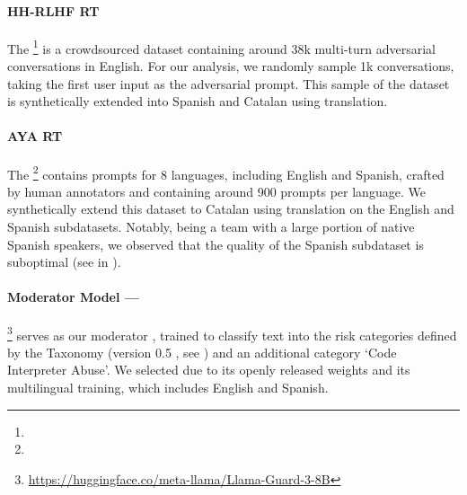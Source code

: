 
\paragraph{HH-RLHF RT} The \HHRedTeamingDataset{}\footnote{\hfLinkHHRLHFDataset{}} \cite{ganguli_hh_rlhf} is a crowdsourced dataset containing around 38k multi-turn adversarial conversations in English. For our analysis, we randomly sample 1k conversations, taking the first user input as the adversarial prompt. This sample of the dataset is synthetically extended into Spanish and Catalan using \NLLB{} translation.

\paragraph{AYA RT} The \AyaDataset{}\footnote{\hfLinkAyaRTDataset{}} \cite{aakanksha_aya_rt_dataset} contains \RedTeaming{} prompts for 8 languages, including English and Spanish, crafted by human annotators and containing around 900 prompts per language. We synthetically extend this dataset to Catalan using \NLLB{} translation on the English and Spanish subdatasets. 
Notably, being a team with a large portion of native Spanish speakers, we observed that the quality of the Spanish subdataset is suboptimal (see  in ).

\newcommand{\hfLinkLlamaGuard}{\url{https://huggingface.co/meta-llama/Llama-Guard-3-8B}}

\paragraph{Moderator Model — \LlamaGuard{}}
\LlamaGuard{}\footnote{\hfLinkLlamaGuard{}} \cite{llama3} serves as our moderator \LLM{}, trained to classify text into the risk categories defined by the \MLCommons{} Taxonomy (version 0.5 \citep{ml_commons_taxonomy}, see  ) and an additional category `Code Interpreter Abuse'. 
We selected \LlamaGuard{} due to its openly released weights and its multilingual training, which includes English and Spanish.


